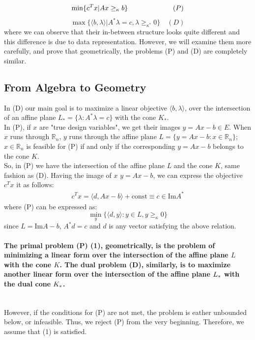 \documentclass[12pt]{article}
\newcommand{\R}{\mathbb{R}}
\begin{document}
    $$ \min \{c^Tx|Ax \geq_\kappa b \} \text{\hspace{2.3cm}} (P) $$
    $$ \max \{\langle b, \lambda \rangle | A^*\lambda = c, \lambda \geq_{\kappa^*} 0 \} \quad (D) $$
    where we can observe that their in-between structure looks quite different and this difference is due to data representation. However, we will examine them more carefully, and prove that geometrically, the problems (P) and (D) are completely similar. 
    \subsection{From Algebra to Geometry}
    In (D) our main goal is to maximize a linear objective $\langle b, \lambda \rangle$, over the intersection of an affine plane $L_* = \{ \lambda : A^* \lambda = c \}$ with the cone $K_*$. \\
    In (P), if $x$ are "true design variables", we get their images $y = Ax - b \in E$. When $x$ runs through $\R_n$, $y$ runs through the affine plane $L = \{y = Ax - b : x \in \R_n\}$; $x \in \R_n$ is feasible for (P) if and only if the corresponding $y = Ax - b$ belongs to the cone $K$. \\
    So, in (P) we have the intersection of the affine plane $L$ and the cone $K$, same fashion as (D).
     Having the image of $x$ $y = Ax - b$, we can express the objective $c^Tx$ it as follows: 
     \begin{align}
     c^Tx = \langle d, Ax - b \rangle + \text{const} \equiv c \in \text{Im}{A^*}
     \end{align}
     where (P) can be expressed as: $$\min\limits_{y}\{ \langle d,y \rangle : y \in L, y \geq_{\kappa} 0 \}$$
     since $L = \text{Im}A - b$, $A^*d = c$ and $d$ is any vector satisfying the above relation. 
     \paragraph{The primal problem (P) (1), geometrically, is the problem of minimizing a linear form over the intersection of the affine plane $L$ with the cone $K$. The dual problem (D), similarly, is to maximize another linear form over the intersection of the affine plane $L_{\**}$ with the dual cone $K_{\**}$. \\ \\}
     However, if the conditions for (P) are not met, the problem is eather unbounded below, or infeasible. Thus, we reject (P) from the very beginning. Therefore, we assume that (1) is satisfied. \\
\end{document}
